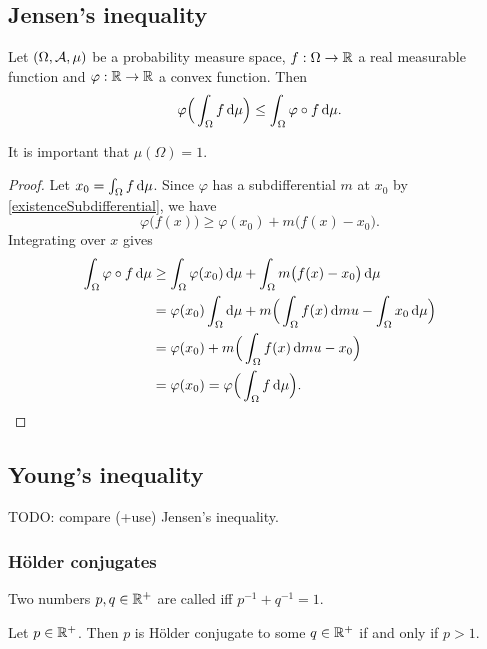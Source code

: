 \subsection{Jensen's inequality}
\begin{theorem}
Let $\sSet{\Omega, \mathcal{A}, \mu}$ be a probability measure space, $f:\Omega\to \mathbb{R}$ a real measurable function and $\varphi:\mathbb{R}\to \mathbb{R}$ a convex function. Then
\[ \varphi\Big(\int_\Omega f \operatorname{d \!}{\mu}\Big) \leq \int_\Omega \varphi\circ f \operatorname{d \!}{\mu}. \]
\end{theorem}
It is important that $\mu(\Omega) = 1$.
\begin{proof}
Let $x_0 = \int_\Omega f \operatorname{d \!}{\mu}$. Since $\varphi$ has a subdifferential $m$ at $x_0$ by \ref{existenceSubdifferential}, we have
\[ \varphi\big(f(x)\big) \geq \varphi(x_0) + m\big(f(x) - x_0\big). \]
Integrating over $x$ gives
\begin{align*}
\int_\Omega \varphi\circ f \diff{\mu} &\geq \int_\Omega\varphi(x_0)\diff{\mu} + \int_\Omega m\big(f(x) - x_0\big) \diff{\mu} \\
&= \varphi(x_0)\int_\Omega\diff{\mu} + m\Big(\int_\Omega f(x)\diff{mu} -\int_\Omega x_0 \diff{\mu}\Big) \\
&= \varphi(x_0) + m\Big(\int_\Omega f(x)\diff{mu} -x_0\Big) \\
&= \varphi(x_0) = \varphi\Big(\int_\Omega f \diff{\mu}\Big).
\end{align*}
\end{proof}

\subsection{Young's inequality}
TODO: compare (+use) Jensen's inequality.

\subsubsection{Hölder conjugates}
\begin{definition}
Two numbers $p,q\in \mathbb{R}^+$ are called  iff $p^{-1} + q^{-1} = 1$.
\end{definition}

\begin{lemma}
Let $p\in \mathbb{R}^+$. Then $p$ is Hölder conjugate to some $q\in \mathbb{R}^+$ \textup{if and only if} $p > 1$.
\end{lemma}

